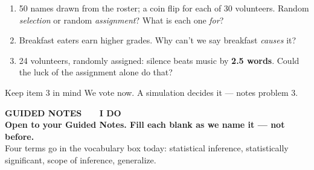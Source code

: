 \documentclass[aspectratio=169, 11pt]{beamer}
\begin{document}
\begin{frame}[t, plain]
  \begin{enumerate}\setlength{\itemsep}{8pt}
    \item 50 names drawn from the roster; a coin flip for each of 30 volunteers. Random
          \emph{selection} or random \emph{assignment}? What is each one \emph{for}?
    \item Breakfast eaters earn higher grades. Why can't we say breakfast \emph{causes} it?
    \item 24 volunteers, randomly assigned: silence beats music by \textbf{2.5 words}. Could
          the luck of the assignment alone do that?
  \end{enumerate}
  \vspace{6pt}
  \begin{block}{Keep item 3 in mind}
    We vote now. A simulation decides it --- notes problem 3.
  \end{block}
\end{frame}

{
\begin{frame}[plain]
  \vspace{1.8cm}\hspace{0.8cm}%
  \begin{minipage}{0.86\textwidth}
    {\color{goldacc}\bfseries\small GUIDED NOTES \ \textbullet\ \ I DO}\\[0.7cm]
    {\color{white}\bfseries\Large Open to your Guided Notes. Fill each blank as we name it
    --- not before.}\\[0.9cm]
    {\color{skymid}\small Four terms go in the vocabulary box today: statistical inference,
    statistically significant, scope of inference, generalize.}
  \end{minipage}
\end{frame}
}
\end{document}
